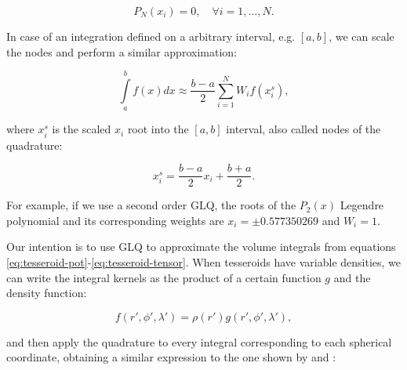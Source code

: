 \documentclass[extra]{gji}
\begin{document}
\begin{equation}
    P_N(x_i) = 0, \quad \forall i = {1,\dots,N}.
\end{equation}

In case of an integration defined on a arbitrary interval, e.g. $[a,b]$, we can scale the nodes and perform a similar approximation:

\begin{equation}
    \int\limits_a^b f(x) dx \approx \frac{b-a}{2} \sum_{i=1}^N W_i f(x_i^s),
\label{eq:glq-scaled}
\end{equation}

\noindent where $x_i^s$ is the scaled $x_i$ root into the $[a,b]$ interval, also called nodes of the quadrature:

\begin{equation}
    x_i^s = \frac{b-a}{2} x_i + \frac{b+a}{2}.
\end{equation}

\noindent For example, if we use a second order GLQ, the roots of the $P_2(x)$ Legendre polynomial and its corresponding weights are $x_i = \pm 0.577350269$ and $W_i = 1$.

Our intention is to use GLQ to approximate the volume integrals from equations \ref{eq:tesseroid-pot}-\ref{eq:tesseroid-tensor}. 
When tesseroids have variable densities, we can write the integral kernels as the product of a certain function $g$ and the density function:

\begin{equation}
    f(r', \phi', \lambda') = \rho(r') g(r', \phi', \lambda'),
\end{equation}

\noindent and then apply the quadrature to every integral corresponding to each spherical coordinate, obtaining a similar expression to the one shown by \citet{Asgharzadeh2007} and \citet{Uieda2016}:

\end{document}
